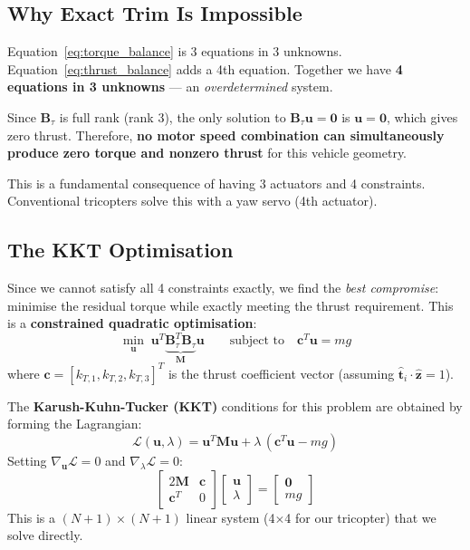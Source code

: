 \documentclass[12pt, a4paper]{article}
\newcommand{\bu}{\bm{u}}
\newcommand{\bB}{\bm{B}}
\begin{document}
\subsection{Why Exact Trim Is Impossible}

Equation~\eqref{eq:torque_balance} is 3 equations in 3 unknowns.  Equation~\eqref{eq:thrust_balance} adds a 4th equation.  Together we have \textbf{4 equations in 3 unknowns} --- an \emph{overdetermined} system.

Since $\bB_\tau$ is full rank (rank 3), the only solution to $\bB_\tau \bu = \bm{0}$ is $\bu = \bm{0}$, which gives zero thrust.  Therefore, \textbf{no motor speed combination can simultaneously produce zero torque and nonzero thrust} for this vehicle geometry.

This is a fundamental consequence of having 3 actuators and 4 constraints.  Conventional tricopters solve this with a yaw servo (4th actuator).

\subsection{The KKT Optimisation}

Since we cannot satisfy all 4 constraints exactly, we find the \emph{best compromise}: minimise the residual torque while exactly meeting the thrust requirement.  This is a \textbf{constrained quadratic optimisation}:
\begin{equation}
    \min_{\bu} \; \bu^T \underbrace{\bB_\tau^T \bB_\tau}_{\bm{M}} \bu
    \qquad \text{subject to} \quad \bm{c}^T \bu = mg
\end{equation}
where $\bm{c} = [k_{T,1}, k_{T,2}, k_{T,3}]^T$ is the thrust coefficient vector (assuming $\hat{\bm{t}}_i \cdot \hat{\bm{z}} = 1$).

The \textbf{Karush-Kuhn-Tucker (KKT)} conditions for this problem are obtained by forming the Lagrangian:
\begin{equation}
    \mathcal{L}(\bu, \lambda) = \bu^T \bm{M} \bu + \lambda \, (\bm{c}^T \bu - mg)
\end{equation}
Setting $\nabla_{\bu} \mathcal{L} = 0$ and $\nabla_\lambda \mathcal{L} = 0$:
\begin{equation}
    \begin{bmatrix} 2\bm{M} & \bm{c} \\ \bm{c}^T & 0 \end{bmatrix}
    \begin{bmatrix} \bu \\ \lambda \end{bmatrix}
    = \begin{bmatrix} \bm{0} \\ mg \end{bmatrix}
    \label{eq:kkt}
\end{equation}
This is a $(N{+}1) \times (N{+}1)$ linear system (4$\times$4 for our tricopter) that we solve directly.
\end{document}
